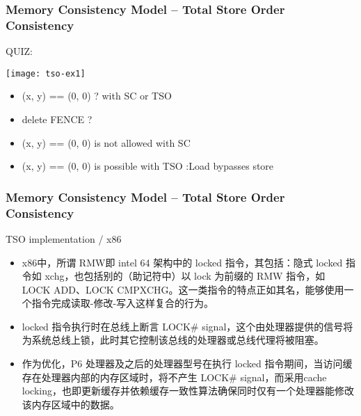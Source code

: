 \begin{frame}[plain]	
    \frametitle{Memory Consistency Model --  Total Store Order  Consistency}
    QUIZ:
    
    \texttt{[image: tso-ex1]}
    \begin{itemize}
        \item  (x, y) == (0, 0) ? with SC or TSO
        \item delete FENCE ?
        
    \end{itemize}
    \pause
     \begin{itemize}
     \item (x, y) == (0, 0) is not allowed with SC
     \item (x, y) == (0, 0) is possible with TSO :Load bypasses store
     
    \end{itemize}
\end{frame}

\begin{frame}[plain]	
    \frametitle{Memory Consistency Model --  Total Store Order  Consistency}
    TSO implementation / x86
    
    \begin{itemize}
        \item  x86中，所谓 RMW即 intel 64 架构中的 locked 指令，其包括：隐式 locked 指令如 xchg，也包括别的（助记符中）以 lock 为前缀的 RMW 指令，如 LOCK ADD、LOCK CMPXCHG。这一类指令的特点正如其名，能够使用一个指令完成读取-修改-写入这样复合的行为。
        \pause
        \item locked 指令执行时在总线上断言 LOCK\# signal，这个由处理器提供的信号将为系统总线上锁，此时其它控制该总线的处理器或总线代理将被阻塞。
        \item 作为优化，P6 处理器及之后的处理器型号在执行 locked 指令期间，当访问缓存在处理器内部的内存区域时，将不产生 LOCK\# signal，而采用cache locking，也即更新缓存并依赖缓存一致性算法确保同时仅有一个处理器能修改该内存区域中的数据。
    \end{itemize}
\end{frame}

